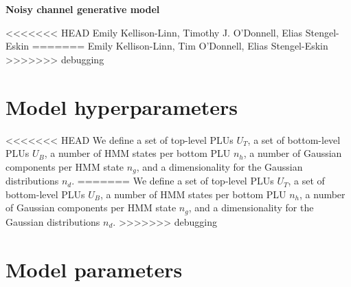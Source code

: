 \documentclass[11pt]{article}
\begin{document}
\begin{center}
	
	{\Large \textbf{Noisy channel generative model}}

<<<<<<< HEAD
	{\normalsize Emily Kellison-Linn, Timothy J. O'Donnell, Elias Stengel-Eskin}
=======
	{\normalsize Emily Kellison-Linn, Tim O'Donnell, Elias Stengel-Eskin}
>>>>>>> debugging
			
\end{center}

\section{Model hyperparameters}

<<<<<<< HEAD
We define a set of top-level PLUs $U_T$, a set of bottom-level PLUs
$U_B$, a number of HMM states per bottom PLU $n_h$, a number of
Gaussian components per HMM state $n_g$, and a dimensionality for the
Gaussian distributions $n_d$.
=======
We define a set of top-level PLUs $U_T$, a set of bottom-level PLUs $U_B$, a number of HMM states per bottom PLU $n_h$, a number of Gaussian components per HMM state $n_g$, and a dimensionality for the Gaussian distributions $n_d$.
>>>>>>> debugging

\section{Model parameters}
\end{document}
